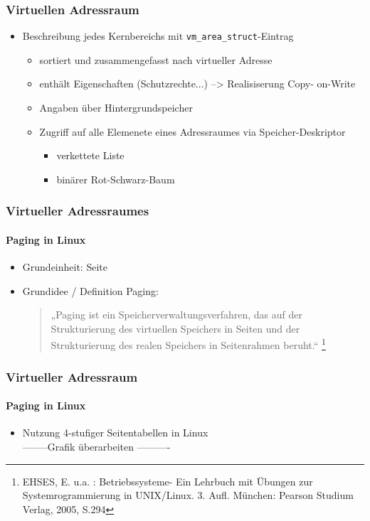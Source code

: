 \documentclass[ddcfooter,nosectionnum]{tudbeamer}
\begin{document}
\begin{frame}
    \frametitle{Virtuellen Adressraum}
    \begin{itemize}
    	    \item Beschreibung jedes Kernbereichs mit \texttt{vm\_area\_struct}-Eintrag 
   		\begin{itemize}
			 \item sortiert und zusammengefasst nach virtueller Adresse\\
			\item enthält Eigenschaften (Schutzrechte...)
			--> Realisiserung Copy- on-Write
			\item Angaben über Hintergrundspeicher
    			\item Zugriff auf alle Elemenete eines Adressraumes via Speicher-Deskriptor
			\begin{itemize}
				\item verkettete Liste
				\item binärer Rot-Schwarz-Baum
			\end{itemize}
   		\end{itemize} 
	\end{itemize}
    
\end{frame}

\begin{frame}
    \frametitle{Virtueller Adressraumes}
    \framesubtitle {Paging in Linux}
    \begin{itemize}
         \item  Grundeinheit: Seite
         \item Grundidee / Definition Paging: \\
        \begin{quote}
         „Paging ist ein Speicherverwaltungsverfahren, das auf der Strukturierung  des virtuellen Speichers 	in Seiten und der Strukturierung des realen Speichers in Seitenrahmen beruht.“
         \footnote{EHSES, E. u.a. : Betriebssysteme- Ein Lehrbuch mit Übungen zur Systemrogrammierung in UNIX/Linux. 3. Aufl. München: Pearson Studium Verlag, 2005, S.294}
	\end{quote}
 	
	
    
    
     \end{itemize}
    
\end{frame}


\begin{frame}
    \frametitle{Virtueller Adressraum}
    \framesubtitle {Paging in Linux}
    \begin{itemize}
         \item Nutzung 4-stufiger Seitentabellen in Linux\\
         --------Grafik überarbeiten ----------
    
    
     \end{itemize}
    
\end{frame}
\end{document}
